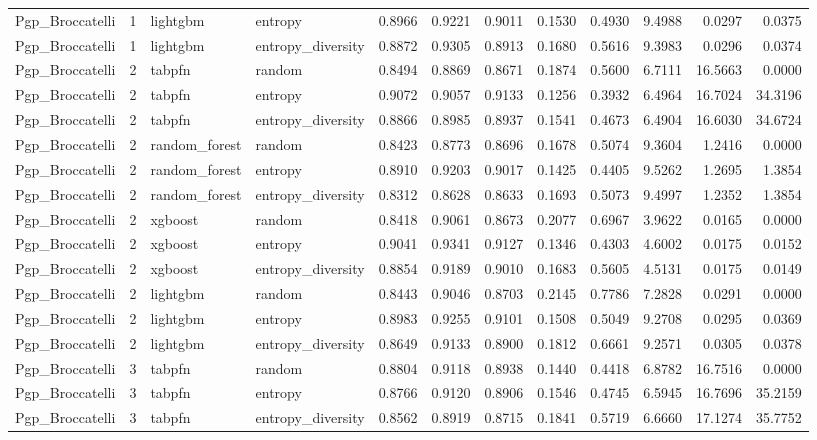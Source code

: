 \begin{tabular}{lrllrrrrrrrr}
Pgp_Broccatelli & 1 & lightgbm & entropy & 0.8966 & 0.9221 & 0.9011 & 0.1530 & 0.4930 & 9.4988 & 0.0297 & 0.0375 \\
Pgp_Broccatelli & 1 & lightgbm & entropy_diversity & 0.8872 & 0.9305 & 0.8913 & 0.1680 & 0.5616 & 9.3983 & 0.0296 & 0.0374 \\
Pgp_Broccatelli & 2 & tabpfn & random & 0.8494 & 0.8869 & 0.8671 & 0.1874 & 0.5600 & 6.7111 & 16.5663 & 0.0000 \\
Pgp_Broccatelli & 2 & tabpfn & entropy & 0.9072 & 0.9057 & 0.9133 & 0.1256 & 0.3932 & 6.4964 & 16.7024 & 34.3196 \\
Pgp_Broccatelli & 2 & tabpfn & entropy_diversity & 0.8866 & 0.8985 & 0.8937 & 0.1541 & 0.4673 & 6.4904 & 16.6030 & 34.6724 \\
Pgp_Broccatelli & 2 & random_forest & random & 0.8423 & 0.8773 & 0.8696 & 0.1678 & 0.5074 & 9.3604 & 1.2416 & 0.0000 \\
Pgp_Broccatelli & 2 & random_forest & entropy & 0.8910 & 0.9203 & 0.9017 & 0.1425 & 0.4405 & 9.5262 & 1.2695 & 1.3854 \\
Pgp_Broccatelli & 2 & random_forest & entropy_diversity & 0.8312 & 0.8628 & 0.8633 & 0.1693 & 0.5073 & 9.4997 & 1.2352 & 1.3854 \\
Pgp_Broccatelli & 2 & xgboost & random & 0.8418 & 0.9061 & 0.8673 & 0.2077 & 0.6967 & 3.9622 & 0.0165 & 0.0000 \\
Pgp_Broccatelli & 2 & xgboost & entropy & 0.9041 & 0.9341 & 0.9127 & 0.1346 & 0.4303 & 4.6002 & 0.0175 & 0.0152 \\
Pgp_Broccatelli & 2 & xgboost & entropy_diversity & 0.8854 & 0.9189 & 0.9010 & 0.1683 & 0.5605 & 4.5131 & 0.0175 & 0.0149 \\
Pgp_Broccatelli & 2 & lightgbm & random & 0.8443 & 0.9046 & 0.8703 & 0.2145 & 0.7786 & 7.2828 & 0.0291 & 0.0000 \\
Pgp_Broccatelli & 2 & lightgbm & entropy & 0.8983 & 0.9255 & 0.9101 & 0.1508 & 0.5049 & 9.2708 & 0.0295 & 0.0369 \\
Pgp_Broccatelli & 2 & lightgbm & entropy_diversity & 0.8649 & 0.9133 & 0.8900 & 0.1812 & 0.6661 & 9.2571 & 0.0305 & 0.0378 \\
Pgp_Broccatelli & 3 & tabpfn & random & 0.8804 & 0.9118 & 0.8938 & 0.1440 & 0.4418 & 6.8782 & 16.7516 & 0.0000 \\
Pgp_Broccatelli & 3 & tabpfn & entropy & 0.8766 & 0.9120 & 0.8906 & 0.1546 & 0.4745 & 6.5945 & 16.7696 & 35.2159 \\
Pgp_Broccatelli & 3 & tabpfn & entropy_diversity & 0.8562 & 0.8919 & 0.8715 & 0.1841 & 0.5719 & 6.6660 & 17.1274 & 35.7752 \\

\end{tabular}
